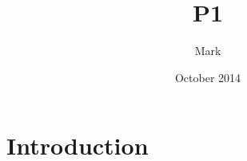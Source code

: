 \documentclass{article}
\title{P1}
\author{Mark}
\date{October 2014}
\begin{document}
\maketitle

\section{Introduction}
\end{document}
